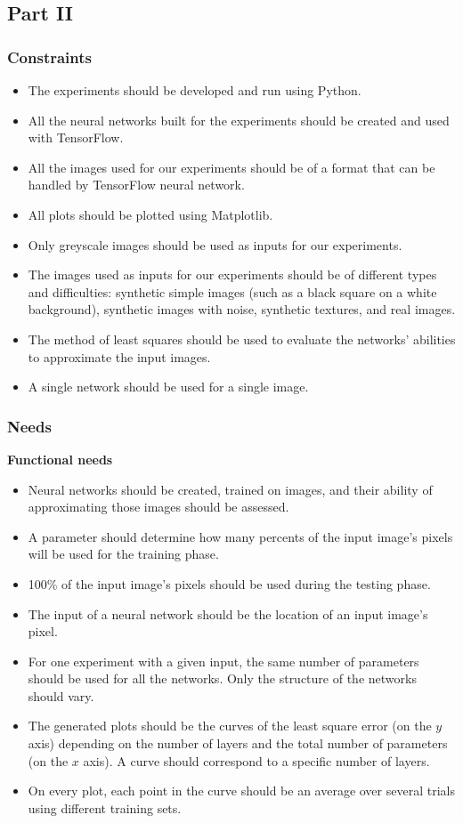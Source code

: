 \documentclass[a4paper]{article}
\begin{document}
\subsection{Part II}
\subsubsection{Constraints}
\begin{itemize}
\item The experiments should be developed and run using Python.
\item All the neural networks built for the experiments should be created and used with TensorFlow.
\item All the images used for our experiments should be of a format that can be handled by TensorFlow neural network. 
\item All plots should be plotted using Matplotlib.
\item Only greyscale images should be used as inputs for our experiments.
\item The images used as inputs for our experiments should be of different types and difficulties: synthetic simple images (such as a black square on a white background), synthetic images with noise, synthetic textures, and real images.
\item The method of least squares should be used to evaluate the networks' abilities to approximate the input images.
\item A single network should be used for a single image.
\end{itemize}

\subsubsection{Needs}
\noindent\textbf{Functional needs}
\begin{itemize}
\item Neural networks should be created, trained on images, and their ability of approximating those images should be assessed. 
\item A parameter should determine how many percents of the input image's pixels will be used for the training phase.
\item 100\% of the input image's pixels should be used during the testing phase.
\item The input of a neural network should be the location of an input image's pixel.
\item For one experiment with a given input, the same number of parameters should be used for all the networks. Only the structure of the networks should vary.
\item The generated plots should be the curves of the least square error (on the $y$ axis) depending on the number of layers and the total number of parameters (on the $x$ axis). A curve should correspond to a specific number of layers.
\item On every plot, each point in the curve should be an average over several trials using different training sets.

\end{itemize}
\end{document}
